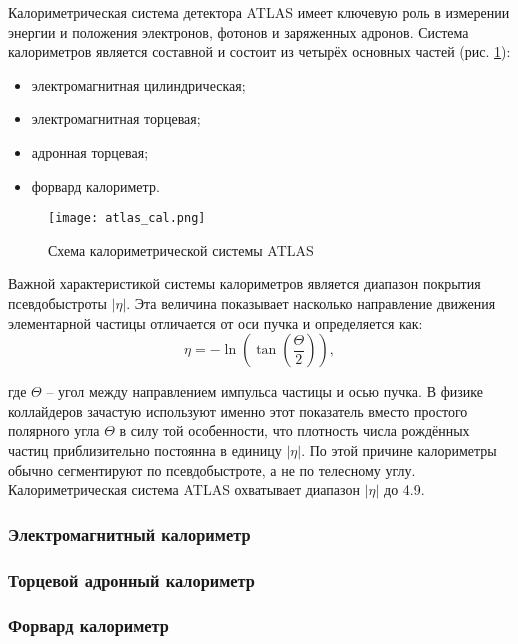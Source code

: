 Калориметрическая система детектора ATLAS имеет ключевую роль в измерении энергии и положения электронов, фотонов и заряженных адронов. Система калориметров является составной и состоит из четырёх основных частей \parencite{tdr_green} (рис. \ref{fig:atlas_cal}):
\begin {itemize}
    \item электромагнитная цилиндрическая;
    \item электромагнитная торцевая;
    \item адронная торцевая;
    \item форвард калориметр.
\end{itemize}\par
\begin{figure}[ht]
    \centering
    \texttt{[image: atlas\_cal.png]}
    \caption{Схема калориметрической системы ATLAS}
    \label{fig:atlas_cal}
\end{figure}
Важной характеристикой системы калориметров является диапазон покрытия псевдобыстроты $|\eta|$. Эта величина показывает насколько направление движения элементарной частицы отличается от оси пучка и определяется как:
\begin{equation}
    \eta = -\ln(\tan(\frac{\Theta}{2})),
\end{equation}\par
где $\Theta$ -- угол между направлением импульса частицы и осью пучка. В физике коллайдеров зачастую используют именно этот показатель вместо простого полярного угла $\Theta$ в силу той особенности, что плотность числа рождённых частиц приблизительно постоянна в единицу $|\eta|$. По этой причине калориметры обычно сегментируют по псевдобыстроте, а не по телесному углу. Калориметрическая система ATLAS охватывает диапазон $|\eta|$ до 4.9.

\subsubsection{Электромагнитный калориметр}


\subsubsection{Торцевой адронный калориметр}


\subsubsection{Форвард калориметр}

